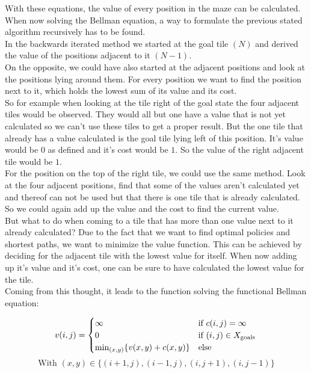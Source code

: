 \documentclass[conference]{IEEEtran}
\begin{document}
With these equations, the value of every position in the maze can be calculated.\\
When now solving the Bellman equation, a way to formulate the previous stated algorithm recursively has to be found.\\
In the backwards iterated method we started at the goal tile $(N)$ and derived the value of the positions adjacent to it $(N-1)$. \\
On the opposite, we could have also started at the adjacent positions and look at the positions lying around them. For every position we want to find the position next to it, which holds the lowest sum of its value and its cost.\\
So for example when looking at the tile right of the goal state the four adjacent tiles would be observed. They would all but one have a value that is not yet calculated so we can't use these tiles to get a proper result. But the one tile that already has a value calculated is the goal tile lying left of this position. It's value would be $0$ as defined and it's cost would be $1$. So the value of the right adjacent tile would be $1$.\\
For the position on the top of the right tile, we could use the same method. Look at the four adjacent positions, find that some of the values aren't calculated yet and thereof can not be used but that there is one tile that is already calculated. So we could again add up the value and the cost to find the current value.\\
But what to do when coming to a tile that has more than one value next to it already calculated? Due to the fact that we want to find optimal policies and shortest paths, we want to minimize the value function. This can be achieved by deciding for the adjacent tile with the lowest value for itself. When now adding up it's value and it's cost, one can be sure to have calculated the lowest value for the tile.\\
Coming from this thought, it leads to the function solving the functional Bellman equation:

\begin{small}
\begin{equation}
v(i,j) =
  \begin{cases}
  \centering
    \infty & \text{if } c(i,j) = \infty\\
    0 & \text{if } (i,j) \in X_\text{goals}\\
    \min_{(x,y)} \{v(x,y) + c(x,y)\} & \text{else}\\
  \end{cases}\\
\end{equation}
\begin{equation*}
\text{With } (x,y) \in \{(i+1,j),(i-1,j),(i,j+1),(i,j-1)\}
\end{equation*}
\end{small}
\end{document}
